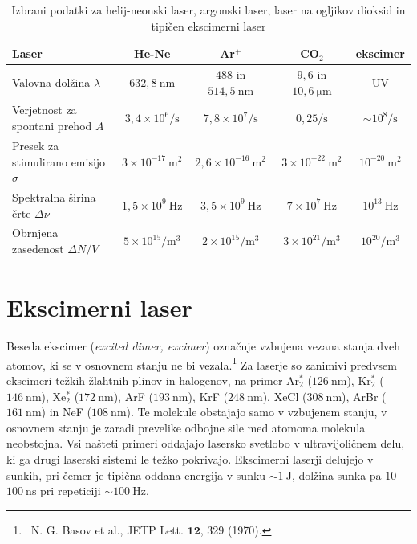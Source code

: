 \begin{table}
\small
\begin{center}
\begin{tabular}{|l|c|c|c|c|}\hline
Laser & He-Ne & Ar$^+$ & CO$_2$ & ekscimer\\ \hline
Valovna dolžina  $\lambda$ & $632,8~\si{\nano\metre}$& $488$ in
$514,5~\si{\nano\metre}$ & $9,6$ in $10,6~\si{\micro\metre}$ & UV
\\ \hline
Verjetnost za spontani prehod $A$ & $3,4 \times 10^6/\si{\second}$ & 
$7,8 \times 10^7/\si{\second}$ & $0,25/\si{\second}$ & $\sim 10^8/\si{\second}$ \\ \hline
Presek za stimulirano emisijo $\sigma$ & $3 \times 10^{-17}~\si{\metre}^2$&  $2,6 \times 10^{-16}~\si{\metre}^2$ & $3 \times 10^{-22}~\si{\metre}^2$ & $ 10^{-20}~\si{\metre}^2$ \\ \hline
Spektralna širina črte $\Delta \nu$ & $1,5 \times 10^{9}~\si{\hertz}$ & 
$3,5 \times 10^{9}~\si{\hertz}$ &$7 \times 10^{7}~\si{\hertz}$ & $10^{13}~\si{\hertz}$ \\ \hline
Obrnjena zasedenost $\Delta N/V$ & $5 \times 10^{15}/\si{\metre}^3$ & $2 \times 10^{15}/\si{\metre}^3$ & $3 \times 10^{21}/\si{\metre}^3$ & $10^{20}/\si{\metre}^3$\\ \hline
\end{tabular}
\caption{Izbrani podatki za helij-neonski laser, argonski laser, laser na ogljikov dioksid in tipičen ekscimerni laser}
\label{tab:Ar}
\end{center}
\end{table}

\section{Ekscimerni laser}
Beseda ekscimer ({\it excited dimer, excimer}) označuje vzbujena vezana 
stanja dveh atomov, 
ki se v osnovnem stanju ne bi vezala.\footnote{~N. G. Basov et al., JETP Lett.
$\mathbf{12}$, 329 (1970).}
Za laserje so zanimivi predvsem ekscimeri
težkih žlahtnih plinov in halogenov, na primer Ar$_2^*$ ($126~\si{\nano\metre}$), 
Kr$_2^*$ ($146~\si{\nano\metre}$), Xe$_2^*$ ($172~\si{\nano\metre}$),
ArF ($193~\si{\nano\metre}$), KrF ($248~\si{\nano\metre}$), 
XeCl ($308~\si{\nano\metre}$), ArBr ($161~\si{\nano\metre}$) in 
NeF ($108~\si{\nano\metre}$). Te molekule obstajajo samo v vzbujenem stanju,
v osnovnem stanju  je zaradi prevelike odbojne sile med atomoma molekula neobstojna.
Vsi našteti primeri oddajajo lasersko svetlobo v
ultravijoličnem delu, ki ga drugi laserski sistemi le težko pokrivajo. 
Ekscimerni laserji delujejo v sunkih, pri čemer je tipična oddana energija v sunku 
$\sim 1~\si{\joule}$, dolžina sunka pa $10$--$100~\si{\nano\second}$ pri repeticiji
$\sim 100~\si{\hertz}$.

